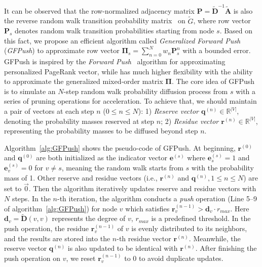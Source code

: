  It can be observed that the row-normalized adjacency matrix $\mathbf{P}=\widetilde{\mathbf{D}}^{-1}\widetilde{\mathbf{A}}$ is also the reverse random walk transition probability matrix~\cite{chen2020scalable} on $\widetilde{G}$, where row vector $\mathbf{P}_s$ denotes random walk transition probabilities starting from node $s$.
Based on this fact, we propose an efficient algorithm called \textit{Generalized Forward Push} (\textit{GFPush}) to approximate row vector $\mathbf{\Pi}_s=\sum_{n=0}^Nw_n\mathbf{P}^n_s$ with a bounded error.
GFPush is inspired by the \textit{Forward Push}~\cite{andersen2006local} algorithm for approximating personalized PageRank vector, while has much higher flexibility with the ability to approximate the generalized mixed-order matrix $\mathbf{\Pi}$.
The core idea of GFPush is to simulate an $N$-step random walk probability diffusion process from $s$ with a series of pruning operations for acceleration.
To achieve that, we should maintain a pair of vectors at each step $n$ ($0 \leq n \leq N$): 1) \textit{Reserve vector $\mathbf{q}^{(n)} \in \mathbb{R}^{|V|}$}, denoting the probability masses reserved at step $n$; 2) \textit{Residue vector $\mathbf{r}^{(n)}\in \mathbb{R}^{|V|}$}, representing the probability masses to be diffused beyond step $n$.



Algorithm~\ref{alg:GFPush} shows the pseudo-code of GFPush. At beginning, $\mathbf{r}^{(0)}$ and $\mathbf{q}^{(0)}$ are both initialized as the indicator vector $\mathbf{e}^{(s)}$ where $\mathbf{e}^{(s)}_s=1$ and  $\mathbf{e}^{(s)}_v=0$ for $v\neq s$, meaning the random walk starts from $s$ with the probability mass of 1. Other reserve and residue vectors (i.e., $\mathbf{r}^{(n)}$ and $\mathbf{q}^{(n)}, 1 \leq n \leq N$) are set to $\vec{0}$.
Then the algorithm iteratively updates reserve and residue vectors with $N$ steps. 
In the $n$-th iteration, the algorithm conducts a \textit{push} operation (Line 5--9 of algorithm~\ref{alg:GFPush}) for node $v$ which satisfies $\mathbf{r}^{(n-1)}_v>\mathbf{d}_v\cdot r_{max}$. Here $\mathbf{d}_v = \widetilde{\mathbf{D}}(v,v)$ represents the degree of $v$,
$r_{max}$ is a predefined threshold. In the push operation, the residue $\mathbf{r}^{(n-1)}_v$ of $v$ is evenly distributed to its neighbors, and the results are stored into the $n$-th residue vector
$\mathbf{r}^{(n)}$. Meanwhile, the reserve vector $\mathbf{q}^{(n)}$ is also updated to be identical with $\mathbf{r}^{(n)}$. After finishing the push operation on $v$, we reset $\mathbf{r}_v^{(n-1)}$ to 0 to avoid duplicate updates.


